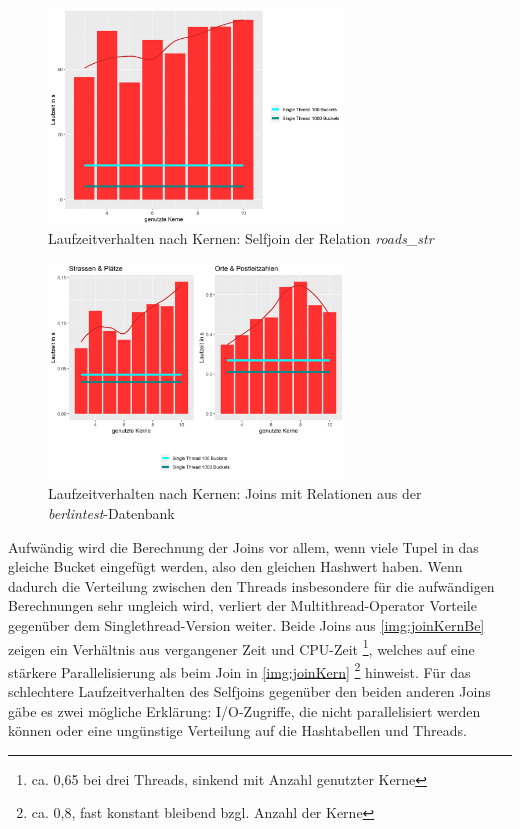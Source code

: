 \documentclass[a4paper,12pt,twoside]{article}
\newcommand{\Fb}[1]{\textit{#1}} %
\begin{document}
{\begin{figure}
	\centering
	\includegraphics[width=0.7\textwidth]{Bilder/join_kerne_self.png}
	\caption{Laufzeitverhalten nach Kernen: Selfjoin der Relation \Fb{roads\_str}}
	\label{img:joinKern}
\end{figure}

\begin{figure}
	\centering
	\includegraphics[width=0.7\textwidth]{Bilder/join_kerne_be.png}
	\caption{Laufzeitverhalten nach Kernen: Joins mit Relationen aus der \Fb{berlintest}-Datenbank}
	\label{img:joinKernBe}
\end{figure}

Aufwändig wird die Berechnung der Joins vor allem, wenn viele Tupel in das gleiche Bucket eingefügt werden, also den gleichen Hashwert haben. Wenn dadurch die Verteilung zwischen den Threads insbesondere für die aufwändigen Berechnungen sehr ungleich wird, verliert der Multithread-Operator Vorteile gegenüber dem Singlethread-Version weiter. Beide Joins aus \autoref{img:joinKernBe} zeigen ein Verhältnis aus vergangener Zeit und CPU-Zeit \footnote{ca. 0,65 bei drei Threads, sinkend mit Anzahl genutzter Kerne}, welches auf eine stärkere Parallelisierung als beim Join in \autoref{img:joinKern} \footnote{ca. 0,8, fast konstant bleibend bzgl. Anzahl der Kerne} hinweist. Für das schlechtere Laufzeitverhalten des Selfjoins gegenüber den beiden anderen Joins gäbe es zwei mögliche Erklärung: I/O-Zugriffe, die nicht parallelisiert werden können oder eine ungünstige Verteilung auf die Hashtabellen und Threads.

}
\end{document}
